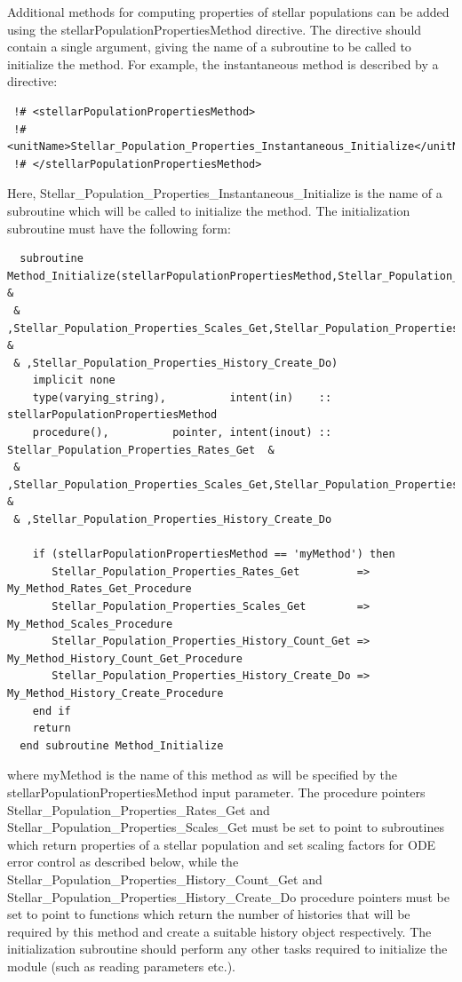 Additional methods for computing properties of stellar populations can be added using the {\normalfont \ttfamily stellarPopulationPropertiesMethod} directive. The directive should contain a single argument, giving the name of a subroutine to be called to initialize the method. For example, the {\normalfont \ttfamily instantaneous} method is described by a directive:
\begin{verbatim}
 !# <stellarPopulationPropertiesMethod>
 !#  <unitName>Stellar_Population_Properties_Instantaneous_Initialize</unitName>
 !# </stellarPopulationPropertiesMethod>
\end{verbatim}
Here, {\normalfont \ttfamily Stellar\_Population\_Properties\_Instantaneous\_Initialize} is the name of a subroutine which will be called to initialize the method. The initialization subroutine must have the following form:
\begin{verbatim}
  subroutine Method_Initialize(stellarPopulationPropertiesMethod,Stellar_Population_Properties_Rates_Get &
 & ,Stellar_Population_Properties_Scales_Get,Stellar_Population_Properties_History_Count_Get             &
 & ,Stellar_Population_Properties_History_Create_Do)
    implicit none
    type(varying_string),          intent(in)    :: stellarPopulationPropertiesMethod
    procedure(),          pointer, intent(inout) :: Stellar_Population_Properties_Rates_Get  &
 & ,Stellar_Population_Properties_Scales_Get,Stellar_Population_Properties_History_Count_Get &
 & ,Stellar_Population_Properties_History_Create_Do
    
    if (stellarPopulationPropertiesMethod == 'myMethod') then
       Stellar_Population_Properties_Rates_Get         => My_Method_Rates_Get_Procedure
       Stellar_Population_Properties_Scales_Get        => My_Method_Scales_Procedure
       Stellar_Population_Properties_History_Count_Get => My_Method_History_Count_Get_Procedure
       Stellar_Population_Properties_History_Create_Do => My_Method_History_Create_Procedure
    end if
    return
  end subroutine Method_Initialize
\end{verbatim}
where {\normalfont \ttfamily myMethod} is the name of this method as will be specified by the {\normalfont \ttfamily stellarPopulationPropertiesMethod} input parameter. The procedure pointers {\normalfont \ttfamily Stellar\_Population\_Properties\_Rates\_Get} and {\normalfont \ttfamily Stellar\_Population\_Properties\_Scales\_Get} must be set to point to subroutines which return properties of a stellar population and set scaling factors for ODE error control as described below, while the {\normalfont \ttfamily Stellar\_Population\_Properties\_History\_Count\_Get} and {\normalfont \ttfamily Stellar\_Population\_Properties\_History\_Create\_Do} procedure pointers must be set to point to functions which return the number of histories that will be required by this method and create a suitable history object respectively. The initialization subroutine should perform any other tasks required to initialize the module (such as reading parameters etc.).

